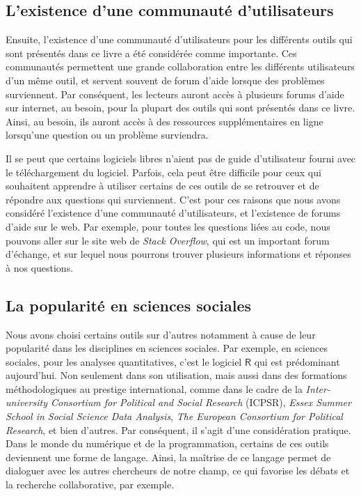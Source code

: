 \documentclass[
  letterpaper,
  DIV=11,
  numbers=noendperiod,
  oneside]{scrreprt}
\begin{document}
\hypertarget{lexistence-dune-communautuxe9-dutilisateurs}{%
\subsection{L'existence d'une communauté
d'utilisateurs}\label{lexistence-dune-communautuxe9-dutilisateurs}}

Ensuite, l'existence d'une communauté d'utilisateurs pour les différents
outils qui sont présentés dans ce livre a été considérée comme
importante. Ces communautés permettent une grande collaboration entre
les différents utilisateurs d'un même outil, et servent souvent de forum
d'aide lorsque des problèmes surviennent. Par conséquent, les lecteurs
auront accès à plusieurs forums d'aide sur internet, au besoin, pour la
plupart des outils qui sont présentés dans ce livre. Ainsi, au besoin,
ils auront accès à des ressources supplémentaires en ligne lorsqu'une
question ou un problème surviendra.

Il se peut que certains logiciels libres n'aient pas de guide
d'utilisateur fourni avec le téléchargement du logiciel. Parfois, cela
peut être difficile pour ceux qui souhaitent apprendre à utiliser
certains de ces outils de se retrouver et de répondre aux questions qui
surviennent. C'est pour ces raisons que nous avons considéré l'existence
d'une communauté d'utilisateurs, et l'existence de forums d'aide sur le
web. Par exemple, pour toutes les questions liées au code, nous pouvons
aller sur le site web de \emph{Stack Overflow}, qui est un important
forum d'échange, et sur lequel nous pourrons trouver plusieurs
informations et réponses à nos questions.

\hypertarget{la-popularituxe9-en-sciences-sociales}{%
\subsection{La popularité en sciences
sociales}\label{la-popularituxe9-en-sciences-sociales}}

Nous avons choisi certains outils sur d'autres notamment à cause de leur
popularité dans les disciplines en sciences sociales. Par exemple, en
sciences sociales, pour les analyses quantitatives, c'est le logiciel
\(\textsf{R}\) qui est prédominant aujourd'hui. Non seulement dans son
utilisation, mais aussi dans des formations méthodologiques au prestige
international, comme dans le cadre de la \emph{Inter-university
Consortium for Political and Social Research} (ICPSR), \emph{Essex
Summer School in Social Science Data Analysis}, \emph{The European
Consortium for Political Research}, et bien d'autres. Par conséquent, il
s'agit d'une considération pratique. Dans le monde du numérique et de la
programmation, certains de ces outils deviennent une forme de langage.
Ainsi, la maîtrise de ce langage permet de dialoguer avec les autres
chercheurs de notre champ, ce qui favorise les débats et la recherche
collaborative, par exemple.
\end{document}
